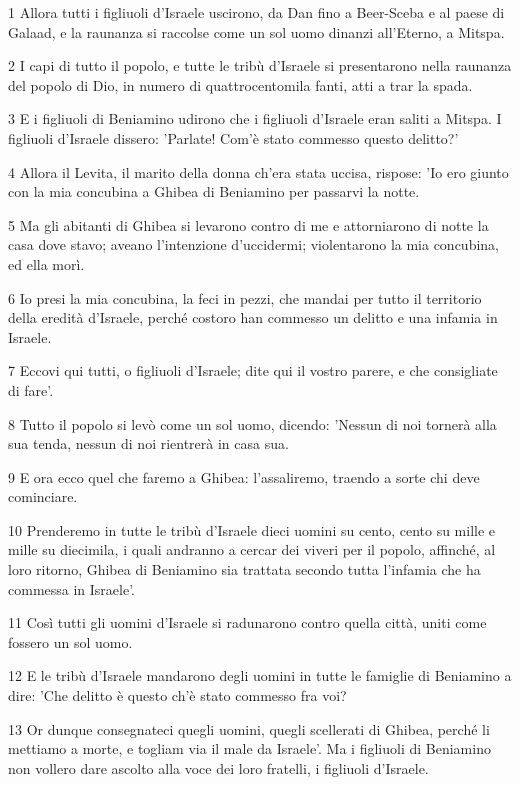 \par 1 Allora tutti i figliuoli d'Israele uscirono, da Dan fino a Beer-Sceba e al paese di Galaad, e la raunanza si raccolse come un sol uomo dinanzi all'Eterno, a Mitspa.
\par 2 I capi di tutto il popolo, e tutte le tribù d'Israele si presentarono nella raunanza del popolo di Dio, in numero di quattrocentomila fanti, atti a trar la spada.
\par 3 E i figliuoli di Beniamino udirono che i figliuoli d'Israele eran saliti a Mitspa. I figliuoli d'Israele dissero: 'Parlate! Com'è stato commesso questo delitto?'
\par 4 Allora il Levita, il marito della donna ch'era stata uccisa, rispose: 'Io ero giunto con la mia concubina a Ghibea di Beniamino per passarvi la notte.
\par 5 Ma gli abitanti di Ghibea si levarono contro di me e attorniarono di notte la casa dove stavo; aveano l'intenzione d'uccidermi; violentarono la mia concubina, ed ella morì.
\par 6 Io presi la mia concubina, la feci in pezzi, che mandai per tutto il territorio della eredità d'Israele, perché costoro han commesso un delitto e una infamia in Israele.
\par 7 Eccovi qui tutti, o figliuoli d'Israele; dite qui il vostro parere, e che consigliate di fare'.
\par 8 Tutto il popolo si levò come un sol uomo, dicendo: 'Nessun di noi tornerà alla sua tenda, nessun di noi rientrerà in casa sua.
\par 9 E ora ecco quel che faremo a Ghibea: l'assaliremo, traendo a sorte chi deve cominciare.
\par 10 Prenderemo in tutte le tribù d'Israele dieci uomini su cento, cento su mille e mille su diecimila, i quali andranno a cercar dei viveri per il popolo, affinché, al loro ritorno, Ghibea di Beniamino sia trattata secondo tutta l'infamia che ha commessa in Israele'.
\par 11 Così tutti gli uomini d'Israele si radunarono contro quella città, uniti come fossero un sol uomo.
\par 12 E le tribù d'Israele mandarono degli uomini in tutte le famiglie di Beniamino a dire: 'Che delitto è questo ch'è stato commesso fra voi?
\par 13 Or dunque consegnateci quegli uomini, quegli scellerati di Ghibea, perché li mettiamo a morte, e togliam via il male da Israele'. Ma i figliuoli di Beniamino non vollero dare ascolto alla voce dei loro fratelli, i figliuoli d'Israele.
